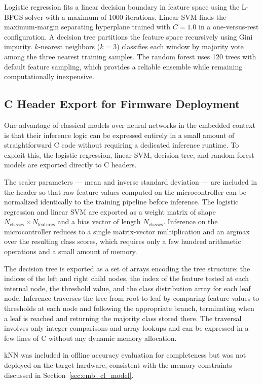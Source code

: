 Logistic regression fits a linear decision boundary in feature space using the L-BFGS solver with a maximum of 1000 iterations. Linear SVM finds the maximum-margin separating hyperplane trained with $C = 1.0$ in a one-versus-rest configuration. A decision tree partitions the feature space recursively using Gini impurity. $k$-nearest neighbors ($k = 3$) classifies each window by majority vote among the three nearest training samples. The random forest uses 120 trees with default feature sampling, which provides a reliable ensemble while remaining computationally inexpensive.

\subsection{C Header Export for Firmware Deployment}

One advantage of classical models over neural networks in the embedded context is that their inference logic can be expressed entirely in a small amount of straightforward C code without requiring a dedicated inference runtime. To exploit this, the logistic regression, linear SVM, decision tree, and random forest models are exported directly to C headers.

The scaler parameters —  mean and inverse standard deviation — are included in the header so that raw feature values computed on the microcontroller can be normalized identically to the training pipeline before inference. The logistic regression and linear SVM are exported as a weight matrix of shape $N_{\text{classes}} \times N_{\text{features}}$ and a bias vector of length $N_{\text{classes}}$. Inference on the microcontroller reduces to a single matrix-vector multiplication and an argmax over the resulting class scores, which requires only a few hundred arithmetic operations and a small amount of memory.

The decision tree is exported as a set of arrays encoding the tree structure: the indices of the left and right child nodes, the index of the feature tested at each internal node, the threshold value, and the class distribution array for each leaf node. Inference traverses the tree from root to leaf by comparing feature values to thresholds at each node and following the appropriate branch, terminating when a leaf is reached and returning the majority class stored there. The traversal involves only integer comparisons and array lookups and can be expressed in a few lines of C without any dynamic memory allocation.

kNN was included in offline accuracy evaluation for completeness but was not deployed on the target hardware, consistent with the memory constraints discussed in Section~\ref{sec:emb_cl_model}.

